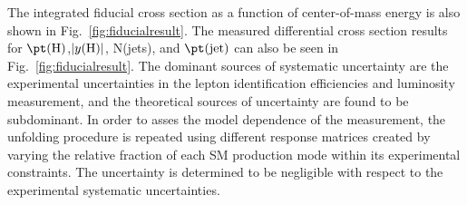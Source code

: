  The integrated fiducial cross section as a function of center-of-mass energy is also shown in Fig.~\ref{fig:fiducialresult}. The measured differential cross 
section results for $\pt({\rm H})$,$|y({\rm H})|$, N(jets), and $\pt({\rm jet})$ can also be seen in Fig.~\ref{fig:fiducialresult}.
The dominant sources of systematic uncertainty are the experimental uncertainties in the lepton identification efficiencies and 
luminosity measurement, and the theoretical sources of uncertainty are found to be subdominant.
In order to asses the model dependence of the measurement, the unfolding procedure is repeated 
using different response matrices created by varying the relative fraction of each SM production mode 
within its experimental constraints. The uncertainty is determined 
to be negligible with respect to the experimental systematic uncertainties. 


